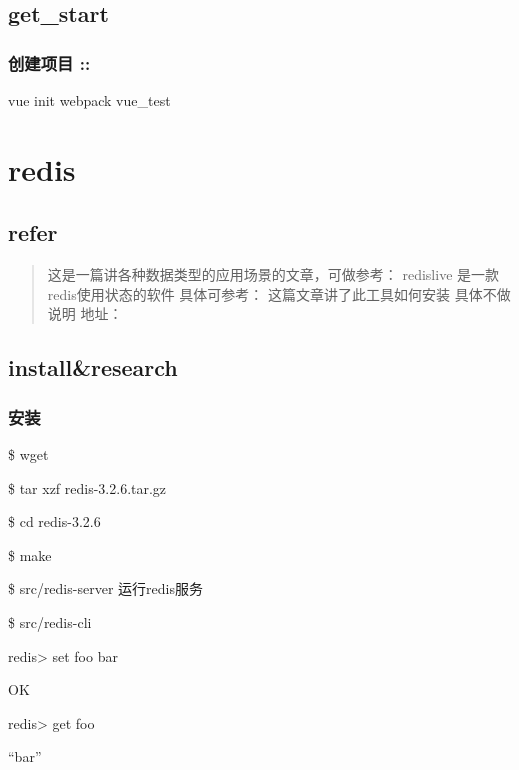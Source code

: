 \documentclass[a4paper,10pt,english]{sphinxmanual}
\begin{document}
\subsection{get\_start}
\label{\detokenize{program/vue:get-start}}

\subsubsection{创建项目     ::}
\label{\detokenize{program/vue:id1}}
vue init webpack vue\_test


\section{redis}
\label{\detokenize{program/redis:redis}}\label{\detokenize{program/redis::doc}}

\subsection{refer}
\label{\detokenize{program/redis:refer}}\begin{quote}

这是一篇讲各种数据类型的应用场景的文章，可做参考：
redislive 是一款redis使用状态的软件 具体可参考：
这篇文章讲了此工具如何安装 具体不做说明 地址：
\end{quote}


\subsection{install\&research}
\label{\detokenize{program/redis:install-research}}

\subsubsection{安装}
\label{\detokenize{program/redis:id1}}
\begin{DUlineblock}{0em}
\item[] \$ wget 
\item[] \$ tar xzf redis-3.2.6.tar.gz
\item[] \$ cd redis-3.2.6
\item[] \$ make
\item[] \$ src/redis-server 运行redis服务
\item[] \$ src/redis-cli
\item[] redis\textgreater{} set foo bar
\item[] OK
\item[] redis\textgreater{} get foo
\item[] “bar”
\end{DUlineblock}
\end{document}
